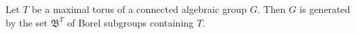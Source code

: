 Let $T$ be a maximal torus of a connected algebraic group $G$. Then $G$ is generated by the set $\mathfrak{B}^T$ of Borel subgroups containing $T$.
